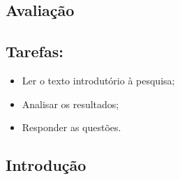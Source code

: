 \documentclass{article}
\begin{document}
\begin{center}
\section*{Avaliação}
\end{center}




\subsection*{Tarefas:}



\begin{itemize}
	\item Ler o texto introdutório à pesquisa;
	
	\item Analisar os resultados;
	\item Responder as questões.
\end{itemize}


\subsection*{Introdução}










\end{document}

